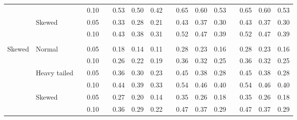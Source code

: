\documentclass{article} %
\begin{document}
\begin{table}[ht]
\begin{scriptsize}
\begin{center}
\begin{tabular}{ll p{.1cm} c p{.1cm} rrr p{.1cm} rrr p{.1cm} rrr}
             &              && 0.10 &&   0.53 & 0.50 & 0.42 && 0.65 & 0.60 & 0.53 && 0.65 & 0.60 & 0.53 \\ 
             & Skewed       && 0.05 &&   0.33 & 0.28 & 0.21 && 0.43 & 0.37 & 0.30 && 0.43 & 0.37 & 0.30 \\ 
             &              && 0.10 &&   0.43 & 0.38 & 0.31 && 0.52 & 0.47 & 0.39 && 0.52 & 0.47 & 0.39 \\ 
             &&&&&&&&&&&&&&&\\
Skewed       & Normal       && 0.05 &&   0.18 & 0.14 & 0.11 && 0.28 & 0.23 & 0.16 && 0.28 & 0.23 & 0.16 \\ 
             &              && 0.10 &&   0.26 & 0.22 & 0.19 && 0.36 & 0.32 & 0.25 && 0.36 & 0.32 & 0.25 \\ 
             & Heavy tailed && 0.05 &&   0.36 & 0.30 & 0.23 && 0.45 & 0.38 & 0.28 && 0.45 & 0.38 & 0.28 \\ 
             &              && 0.10 &&   0.44 & 0.39 & 0.33 && 0.54 & 0.46 & 0.40 && 0.54 & 0.46 & 0.40 \\ 
             & Skewed       && 0.05 &&   0.27 & 0.20 & 0.14 && 0.35 & 0.26 & 0.18 && 0.35 & 0.26 & 0.18 \\ 
             &              && 0.10 &&   0.36 & 0.29 & 0.22 && 0.47 & 0.37 & 0.29 && 0.47 & 0.37 & 0.29 \\ 



\end{tabular}
\end{center}
\end{scriptsize}
\end{table}
\end{document}
